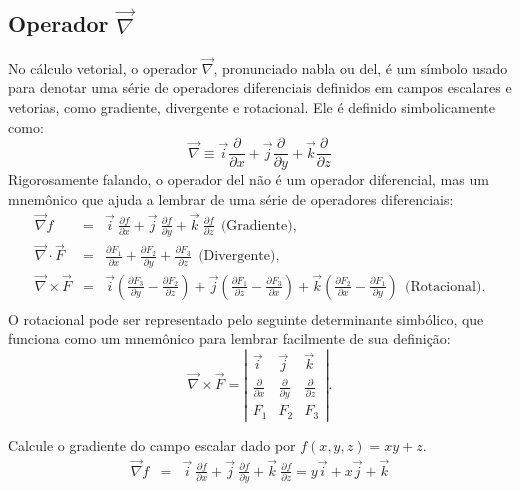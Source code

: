 \subsection{Operador $\vec{\nabla}$}
No cálculo vetorial, o operador $\vec{\nabla}$, pronunciado nabla ou del, é um símbolo usado para denotar uma série de operadores diferenciais definidos em campos escalares e vetorias, como gradiente, divergente e rotacional. Ele é definido simbolicamente como:
\begin{equation}\label{def_del}
\vec{\nabla} \equiv \vec{i}\frac{\partial}{\partial x}+\vec{j}\frac{\partial}{\partial y}+\vec{k}\frac{\partial}{\partial z}
\end{equation}
Rigorosamente falando, o operador del não é um operador diferencial, mas um mnemônico que ajuda a lembrar de uma série de operadores diferenciais:
\begin{eqnarray*}
 \vec{\nabla}f &=& \vec{i}~\!\frac{\partial f}{\partial x}+\vec{j}~\!\frac{\partial f}{\partial y}+\vec{k}~\!\frac{\partial f}{\partial z} ~~ \text{(Gradiente)},\\
 \vec{\nabla}\cdot \vec{F} &=& \frac{\partial F_1}{\partial x}+\frac{\partial F_2}{\partial y}+\frac{\partial F_3}{\partial z} ~~ \text{(Divergente)},\\
 \vec{\nabla}\times \vec{F} &=&  \vec{i}\left(\frac{\partial F_3}{\partial y}-\frac{\partial F_2}{\partial z}\right) + \vec{j}\left(\frac{\partial F_1}{\partial z}-\frac{\partial F_3}{\partial x}\right) + \vec{k}\left(\frac{\partial F_2}{\partial x}-\frac{\partial F_1}{\partial y}\right)~~ \text{(Rotacional)}.\\
\end{eqnarray*}
O rotacional pode ser representado pelo seguinte determinante simbólico, que funciona como um mnemônico para lembrar facilmente de sua definição:
$$
 \vec{\nabla}\times \vec{F}=\left|
 \begin{array}{ccc}
 \vec{i} & \vec{j} & \vec{k} \\
 \frac{\partial}{\partial x} &\frac{\partial}{\partial y} &\frac{\partial}{\partial z} \\
F_1 & F_2 & F_3
 \end{array}
\right|. 
$$

\begin{ex} Calcule o gradiente do campo escalar dado por $f(x,y,z)=xy+z$.
\begin{eqnarray}
 \vec{\nabla}f &=& \vec{i}~\!\frac{\partial f}{\partial x}+\vec{j}~\!\frac{\partial f}{\partial y}+\vec{k}~\!\frac{\partial f}{\partial z}
 =y\vec{i}+x\vec{j}+\vec{k}
\end{eqnarray}
\end{ex}

